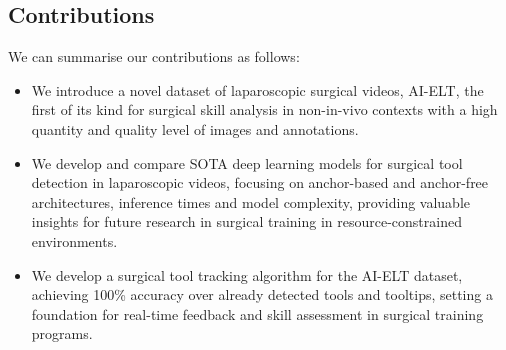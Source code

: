 \subsection{Contributions}

We can summarise our contributions as follows:

\begin{itemize}[noitemsep, left=0pt]
\item We introduce a novel dataset of laparoscopic surgical videos, AI-ELT, the first of its kind for surgical skill analysis in non-in-vivo contexts with a high quantity and quality level of images and annotations.
\item We develop and compare SOTA deep learning models for surgical tool detection in laparoscopic videos, focusing on anchor-based and anchor-free architectures, inference times and model complexity, providing valuable insights for future research in surgical training in resource-constrained environments.
\item We develop a surgical tool tracking algorithm for the AI-ELT dataset, achieving 100\% accuracy over already detected tools and tooltips, setting a foundation for real-time feedback and skill assessment in surgical training programs.
\end{itemize}

